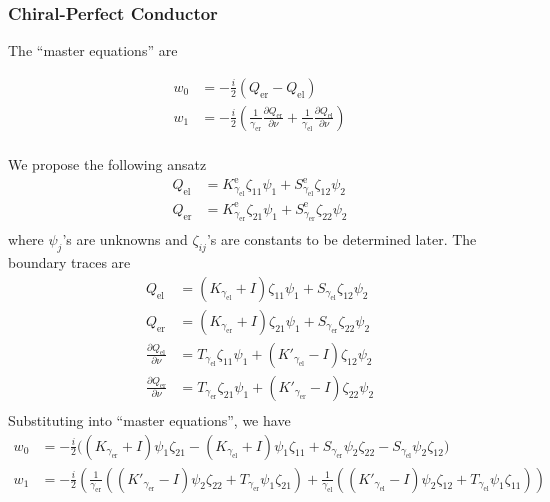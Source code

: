 \subsubsection{Chiral-Perfect Conductor}

The ``master equations'' are

\begin{align*}
  w_0 &= -\frac{i}{2}(Q_\text{er} - Q_\text{el}) \\
  w_1 &= -\frac{i}{2}\left(\frac{1}{\gamma_\text{er}}\frac{\partial Q_\text{er}}{\partial\nu} + \frac{1}{\gamma_\text{el}}\frac{\partial Q_\text{el}}{\partial\nu}\right) \\
\end{align*}

We propose the following ansatz 
\begin{align*}
  Q_\text{el} &= K_{\gamma_\text{el}}^{\text{e}} \zeta_{11}\psi_1 + S_{\gamma_\text{el}}^{\text{e}} \zeta_{12} \psi_2\\
  Q_\text{er} &= K_{\gamma_\text{er}}^{\text{e}} \zeta_{21}\psi_1 + S_{\gamma_\text{er}}^{\text{e}} \zeta_{22} \psi_2\\
\end{align*}
where $\psi_j$'s are unknowns and $\zeta_{ij}$'s are constants to be determined later. The boundary traces are 
\begin{align*}
  Q_\text{el} &= (K_{\gamma_\text{el}} + I) \zeta_{11}\psi_1 + S_{\gamma_\text{el}} \zeta_{12} \psi_2 \\
  Q_\text{er} &= (K_{\gamma_\text{er}} + I) \zeta_{21}\psi_1 + S_{\gamma_\text{er}} \zeta_{22} \psi_2 \\
  \frac{\partial Q_\text{el}}{\partial\nu} &= T_{\gamma_\text{el}} \zeta_{11}\psi_1 + (K'_{\gamma_\text{el}} - I) \zeta_{12} \psi_2\\
  \frac{\partial Q_\text{er}}{\partial\nu} &= T_{\gamma_\text{er}} \zeta_{21}\psi_1 + (K'_{\gamma_\text{er}} - I) \zeta_{22} \psi_2\\
\end{align*}
Substituting into ``master equations'', we have
\begin{align*}
  w_0 &= -\frac{i}{2} \bigl((K_{\gamma_\text{er}} + I)\psi_1 \zeta_{21} -(K_{\gamma_\text{el}}+I)\psi_1 \zeta_{11} +S_{\gamma_\text{er}}\psi_2 \zeta_{22}-S_{\gamma_\text{el}} \psi_2\zeta_{12}\bigr) \\
  w_1 &= -\frac{i}{2}\left(\frac{1}{\gamma_\text{er}}\left((K'_{\gamma_\text{er}}-I)\psi_2 \zeta_{22} +T_{\gamma_\text{er}} \psi_1 \zeta_{21}\right)+\frac{1}{\gamma_\text{el}}\left((K'_{\gamma_\text{el}}-I)\psi_2 \zeta_{12} +T_{\gamma_\text{el}} \psi_1 \zeta_{11}\right)\right)
\end{align*}
